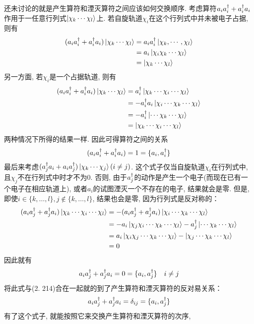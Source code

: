 还未讨论的就是产生算符和湮灭算符之间应该如何交换顺序. 
考虑算符$a_ia^\dagger_i + a^\dagger_ia_i$作用于一任意行列式$\Ket{\chi_k\cdots\chi_l}$上. 
若自旋轨道$\chi_i$在这个行列式中并未被电子占据, 
则有
\begin{align}
(a_ia^\dagger_i + a^\dagger_ia_i) \Ket{\chi_k\cdots\chi_l} & = a_ia^\dagger_i \Ket{\chi_k,\cdots,\chi_l} \\
& = a_i\Ket{\chi_i\chi_k\cdots\chi_l} \\
& = \Ket{\chi_k\cdots\chi_l}
\end{align}
另一方面, 
若$\chi_i$是一个占据轨道, 
则有
\begin{align}
(a_ia^\dagger_i + a^\dagger_ia_i) \Ket{\chi_k\cdots\chi_l} & = a^\dagger_i \Ket{\chi_k\cdots\chi_i\cdots\chi_l} \\
& = -a^\dagger_i a_i \Ket{\chi_i\cdots\chi_k\cdots\chi_l} \\
& = -a^\dagger_i \Ket{\cdots\chi_k\cdots\chi_l} \\
& = \Ket{\chi_k\cdots\chi_i\cdots\chi_l}
\end{align}
两种情况下所得的结果一样. 
因此可得算符之间的关系
\begin{align}
(a_ia^\dagger_i + a^\dagger_ia_i) = 1 = \{ a_i,a^\dagger_i \}
\end{align}
最后来考虑$(a^\dagger_ja_i + a_ia^\dagger_j)\Ket{\chi_k\cdots\chi_j}(i\neq j)$. 
这个式子仅当自旋轨道$\chi_i$在行列式中, 
且$\chi_j$不在行列式中时才不为$0$. 
 否则, 
由于$a^\dagger_j$的动作是产生一个电子(而现在已有一个电子在相应轨道上), 
或者$a_i$的试图湮灭一个不存在的电子, 
结果就会是零.
但是, 
即使$i\in\{ k,\ldots,l \}, j\not\in\{ k,\ldots, l \}$, 
结果也会是零, 
因为行列式是反对称的：
\begin{align}
(a_ia^\dagger_j + a^\dagger_ja_i)\Ket{\chi_k\cdots\chi_i\cdots\chi_l} & = -(a_ia^\dagger_j + a^\dagger_ja_i) \Ket{\chi_i\cdots\chi_k\cdots\chi_l}\notag\\
& = -a_i\Ket{\chi_j\chi_i\cdots\chi_k\cdots\chi_l} - a^\dagger_j\Ket{\cdots\chi_k\cdots\chi_l}\notag\\
& = a_i\Ket{\chi_i\chi_j\cdots\chi_k\cdots\chi_l} - \Ket{\chi_j\cdots\chi_k\cdots\chi_l}\notag\\
& = 0
\end{align}
因此就有
\begin{align}
a_ia^\dagger_j + a^\dagger_ja_i = 0 = \{ a_i, a^\dagger_j \}\quad i\neq j
\end{align}
将此式与(2.
214)合在一起就的到了产生算符和湮灭算符的反对易关系：
\begin{align}
a_ia^\dagger_j + a^\dagger_ja_i = \delta_{ij} = \{ a_i,a^\dagger_j \}
\end{align}
有了这个式子, 
就能按照它来交换产生算符和湮灭算符的次序, 
